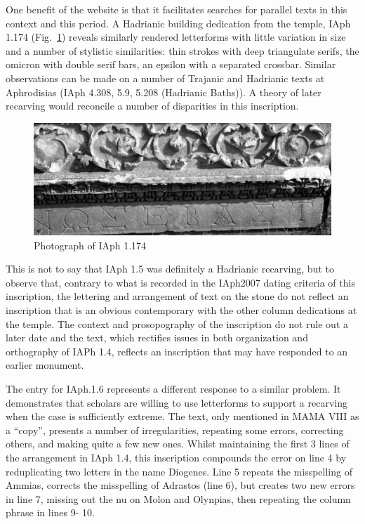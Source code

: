\documentclass[amsthm,ebook]{saparticle}
\begin{document}
One benefit of the website is that it facilitates searches for parallel texts in this context and this period. A
Hadrianic building dedication from the temple, IAph 1.174 (Fig.~\ref{fig:4}) reveals similarly
rendered letterforms with little variation in size and a number of stylistic similarities: thin strokes with deep
triangulate serifs, the omicron with double serif bars, an epsilon with a separated crossbar. Similar observations can
be made on a number of Trajanic and Hadrianic texts at Aphrodisias (IAph 4.308, 5.9, 5.208 (Hadrianic Baths)). A theory
of later recarving would reconcile a number of disparities in this inscription. 







\begin{figure}[!hbp]
\centering
 \includegraphics[width=\columnwidth]{PaperproposalforEAGLEfinal-img004.jpg}
\caption{Photograph of IAph 1.174}
\label{fig:4}
\end{figure}





This is not to say that IAph 1.5 was definitely a Hadrianic recarving, but to observe that, contrary to what is recorded
in the IAph2007 dating criteria of this inscription, the lettering and arrangement of text on the stone do not reflect
an inscription that is an obvious contemporary with the other column dedications at the temple. The context and
prosopography of the inscription do not rule out a later date and the text, which rectifies issues in both organization
and orthography of IAPh 1.4, reflects an inscription that may have responded to an earlier monument. 

The entry for IAph.1.6 represents a different response to a similar problem. It demonstrates that scholars are willing
to use letterforms to support a recarving when the case is sufficiently extreme. The text, only mentioned in MAMA VIII
as a ``copy'', presents a number of irregularities, repeating some errors, correcting others, and making quite a few new
ones. Whilst maintaining the first 3 lines of the arrangement in IAph 1.4, this inscription compounds the error on line
4 by reduplicating two letters in the name Diogenes. Line 5 repeats the misspelling of Ammias, corrects the misspelling
of Adrastos (line 6), but creates two new errors in line 7, missing out the nu on Molon and Olynpias, then repeating
the column phrase in lines 9- 10. 
\end{document}
